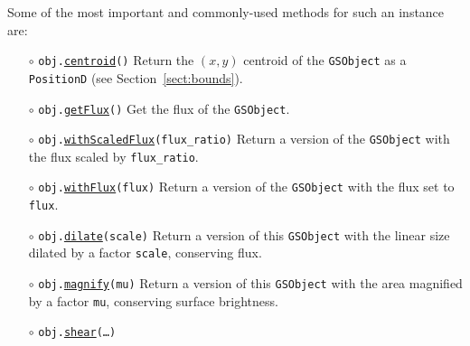 \documentclass[preprint,10pt]{../../devel/modules/aastex}
\begin{document}
Some of the most important and commonly-used methods for such an
instance are:
\begin{itemize}
  \item[$\circ$]
  \texttt{obj.}\href{http://galsim-developers.github.io/GalSim/classgalsim_1_1base_1_1_g_s_object.html#a08a0bb72927fce3c765a9580de656d1a}{\texttt{centroid}}\texttt{()}
    \newline
    Return the $(x, y)$ centroid of the \texttt{GSObject} as a
    \texttt{PositionD} (see Section~\ref{sect:bounds}).
  \item[$\circ$]
  \texttt{obj.}\href{http://galsim-developers.github.io/GalSim/classgalsim_1_1base_1_1_g_s_object.html#a662d8ce421ecd90080bdcaaf6890aed8}{\texttt{getFlux}}\texttt{()}
    \newline
    Get the flux of the \texttt{GSObject}.
  \item[$\circ$]
  \texttt{obj.}\href{http://galsim-developers.github.io/GalSim/classgalsim_1_1base_1_1_g_s_object.html#a21a5b330e1c7565a2bb56258127d6149}{\texttt{withScaledFlux}}\texttt{(flux\_ratio)}
    \newline
    Return a version of the \texttt{GSObject} with the flux scaled by \texttt{flux\_ratio}.
  \item[$\circ$]
  \texttt{obj.}\href{http://galsim-developers.github.io/GalSim/classgalsim_1_1base_1_1_g_s_object.html#a3f12b6158381ca5ef6da8e94f701f3e5}{\texttt{withFlux}}\texttt{(flux)}
    \newline
    Return a version of the \texttt{GSObject} with the flux set to \texttt{flux}.
  \item[$\circ$]
  \texttt{obj.}\href{http://galsim-developers.github.io/GalSim/classgalsim_1_1base_1_1_g_s_object.html#a0e80b6924c48e9708dd9e475f3b48b5f}{\texttt{dilate}}\texttt{(scale)}
    \newline
    Return a version of this \texttt{GSObject} with the linear size dilated by a
    factor \texttt{scale}, conserving flux.
  \item[$\circ$]
  \texttt{obj.}\href{http://galsim-developers.github.io/GalSim/classgalsim_1_1base_1_1_g_s_object.html#aac64da7ce1c4165ba048300fede29943}{\texttt{magnify}}\texttt{(mu)}
    \newline
    Return a version of this \texttt{GSObject} with the area magnified by a
    factor \texttt{mu}, conserving surface brightness.
  \item[$\circ$]
  \texttt{obj.}\href{http://galsim-developers.github.io/GalSim/classgalsim_1_1base_1_1_g_s_object.html#acc3ac16f75958b4a14246e944662ce3f}{\texttt{shear}}\texttt{(\dots)}

\end{itemize}
\end{document}
